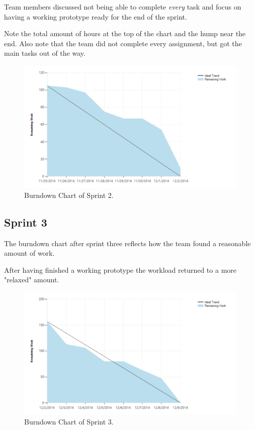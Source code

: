 Team members discussed not being able to complete \textit{every} task and focus on having a working prototype ready for the end of the sprint.

Note the total amount of hours at the top of the chart and the hump near the end. Also note that the team did not complete every assignment, but got the main tasks out of the way.

\begin{figure}[H]
	\centering
	\includegraphics[scale=0.40]{Figures/Burndown2}
	\caption{Burndown Chart of Sprint 2.}
\end{figure}

\subsection{Sprint 3}
The burndown chart after sprint three reflects how the team found a reasonable amount of work. 

After having finished a working prototype the workload returned to a more "relaxed" amount.

\begin{figure}[H]
	\centering
	\includegraphics[scale=0.40]{Figures/Burndown3}
	\caption{Burndown Chart of Sprint 3.}
\end{figure}

